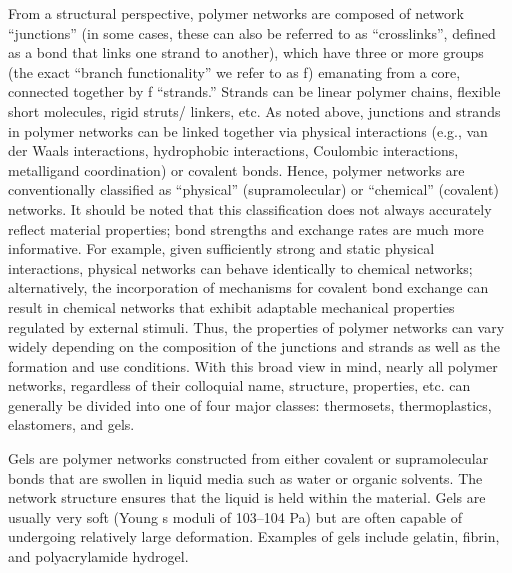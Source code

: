 \documentclass[../../main-notes.tex]{subfiles}
\begin{document}
From a structural perspective, polymer networks are composed of network “junctions” (in some cases, these can also be referred to as “crosslinks”, defined as a bond that links one strand to another), which have three or more groups (the exact “branch functionality” we refer to as f) emanating from a core, connected together by f “strands.” 
Strands can be linear polymer chains, flexible short molecules, rigid struts/ linkers, etc. 
As noted above, junctions and strands in polymer networks can be linked together via physical interactions (e.g., van der Waals interactions, hydrophobic interactions, Coulombic interactions, metalligand coordination) or covalent bonds. 
Hence, polymer networks are conventionally classified as “physical” (supramolecular) or “chemical” (covalent) networks. 
It should be noted that this classification does not always accurately reflect material properties; bond strengths and exchange rates are much more informative. 
For example, given sufficiently strong and static physical interactions, physical networks can behave identically to chemical networks; alternatively, the incorporation of mechanisms for covalent bond exchange can result in chemical networks that exhibit adaptable mechanical properties regulated by external stimuli. 
Thus, the properties of polymer networks can vary widely depending on the composition of the junctions and strands as well as the formation and use conditions. 
With this broad view in mind, nearly all polymer networks, regardless of their colloquial name, structure, properties, etc. can generally be divided into one of four major classes: thermosets, thermoplastics, elastomers, and gels.

Gels are polymer networks constructed from either covalent or supramolecular bonds that are swollen in liquid media such as water or organic solvents. 
The network structure ensures that the liquid is held within the material. 
Gels are usually very soft (Young s moduli of 103–104 Pa) but are often capable of undergoing relatively large deformation. 
Examples of gels include gelatin, fibrin, and polyacrylamide hydrogel.
\end{document}
